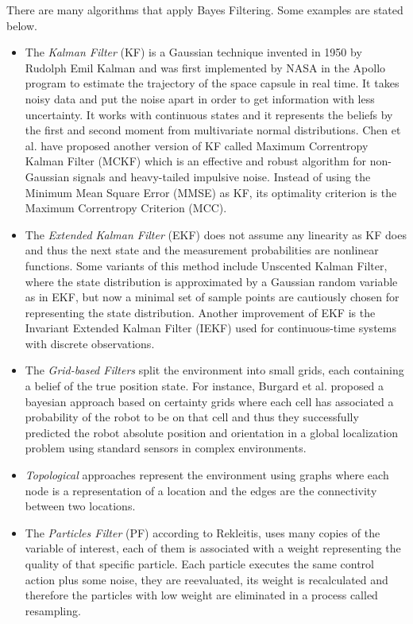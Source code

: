 There are many algorithms that apply Bayes Filtering. Some examples are stated below.
\begin{itemize}
\item The \textit{Kalman Filter} (KF) is a Gaussian technique invented in 1950 by Rudolph Emil Kalman\cite{Kalman:filter} and was first implemented by NASA in the Apollo program to estimate the trajectory of the space capsule in real time\cite{Barrau:IKF}. It takes noisy data and put the noise apart in order to get information with less uncertainty\cite{Matthew:kalman-tutorial}. It works with continuous states and it represents the beliefs by the first and second moment\cite{Liao:bayesian-filters} from multivariate normal distributions. Chen et al. have proposed another version of KF called Maximum Correntropy Kalman Filter (MCKF) which is an effective and robust algorithm for non-Gaussian signals and heavy-tailed impulsive noise. Instead of using the Minimum Mean Square Error (MMSE) as KF, its optimality criterion is the Maximum Correntropy Criterion (MCC)\cite{Chen:MCKF}. 
\item The \textit{Extended Kalman Filter} (EKF) does not assume any linearity as KF does and thus the next state and the measurement probabilities are nonlinear functions\cite{Zarchan:fundam-kalman}\cite{Thrun:2005:PR:1121596}. Some variants of this method include Unscented Kalman Filter, where the state distribution is approximated by a Gaussian random variable as in EKF, but now a minimal set of sample points are cautiously chosen for representing the state distribution\cite{Julier:UKF}\cite{Wan:UKF}. Another improvement of EKF is the Invariant Extended Kalman Filter (IEKF) used for continuous-time systems with discrete observations\cite{Barrau:IEKF}.
\item The \textit{Grid-based Filters} split the environment into small grids, each containing a belief of the true position state\cite{Liao:bayesian-filters}. For instance, Burgard et al. proposed a bayesian approach based on certainty grids where each cell has associated a probability of the robot to be on that cell and thus they successfully predicted the robot absolute position and orientation in a global localization problem using standard sensors in complex environments\cite{Burgard:grid-based}.
\item \textit{Topological} approaches represent the environment using graphs where each node is a representation of a location and the edges are the connectivity between two locations\cite{Liao:bayesian-filters}.
\item The \textit{Particles Filter} (PF) according to Rekleitis, uses many copies of the variable of interest, each of them is associated with a weight representing the quality of that specific particle. Each particle executes the same control action plus some noise, they are reevaluated, its weight is recalculated and therefore the particles with low weight are eliminated in a process called resampling\cite{Rekleitis:particles-filter}.
\end{itemize}

